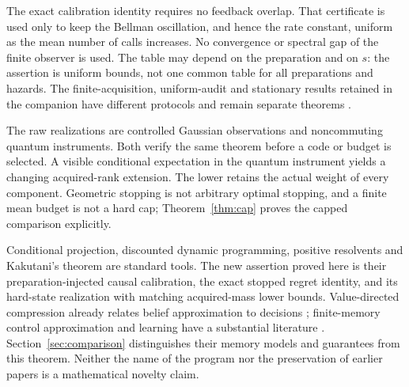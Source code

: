 The exact calibration identity requires no feedback overlap. That certificate is used only to keep the Bellman oscillation, and hence the rate constant, uniform as the mean number of calls increases. No convergence or spectral gap of the finite observer is used. The table may depend on the preparation and on $s$: the assertion is uniform bounds, not one common table for all preparations and hazards. The finite-acquisition, uniform-audit and stationary results retained in the companion have different protocols and remain separate theorems \cite{GTFFinite}.

The raw realizations are controlled Gaussian observations and noncommuting quantum instruments. Both verify the same theorem before a code or budget is selected. A visible conditional expectation in the quantum instrument yields a changing acquired-rank extension. The lower retains the actual weight of every component. Geometric stopping is not arbitrary optimal stopping, and a finite mean budget is not a hard cap; Theorem~\ref{thm:cap} proves the capped comparison explicitly.

Conditional projection, discounted dynamic programming, positive resolvents and Kakutani's theorem are standard tools. The new assertion proved here is their preparation-injected causal calibration, the exact stopped regret identity, and its hard-state realization with matching acquired-mass lower bounds. Value-directed compression already relates belief approximation to decisions \cite{PB2002}; finite-memory control approximation and learning have a substantial literature \cite{KY2022,Kim2026,YB2008}. Section~\ref{sec:comparison} distinguishes their memory models and guarantees from this theorem. Neither the name of the program nor the preservation of earlier papers is a mathematical novelty claim.

